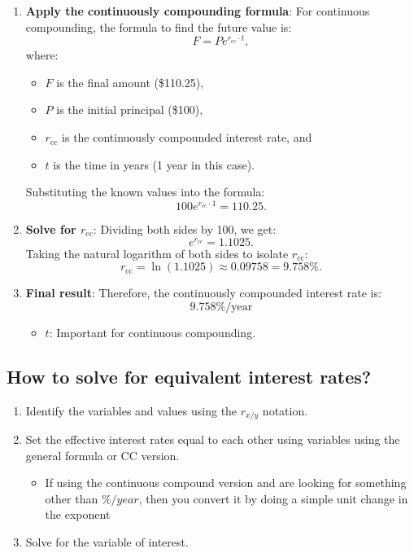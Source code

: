 \begin{example}
    \begin{enumerate}
        \item \textbf{Apply the continuously compounding formula}: 
        For continuous compounding, the formula to find the future value is:
        \[
        F = P e^{r_{\text{cc}} \cdot t},
        \]
        where:
        \begin{itemize}
            \item \(F\) is the final amount (\$110.25),
            \item \(P\) is the initial principal (\$100),
            \item \(r_{\text{cc}}\) is the continuously compounded interest rate, and
            \item \(t\) is the time in years (1 year in this case).
        \end{itemize}
        Substituting the known values into the formula:
        \[
        100 e^{r_{\text{cc}} \cdot 1} = 110.25.
        \]

        \item \textbf{Solve for \(r_{\text{cc}}\)}: 
        Dividing both sides by 100, we get:
        \[
        e^{r_{\text{cc}}} = 1.1025.
        \]
        Taking the natural logarithm of both sides to isolate \(r_{\text{cc}}\):
        \[
        r_{\text{cc}} = \ln(1.1025) \approx 0.09758 = 9.758\%.
        \]

        \item \textbf{Final result}: 
        Therefore, the continuously compounded interest rate is:
        \[
        \boxed{9.758\%/\text{year}}
        \]
        \begin{itemize}
            \item $t$: Important for continuous compounding.
        \end{itemize}
    \end{enumerate}
\end{example}

\subsection{How to solve for equivalent interest rates?}
\begin{process}
    \begin{enumerate}
        \item Identify the variables and values using the $r_{x/y}$ notation. 
        \item Set the effective interest rates equal to each other using variables using the general formula or CC version.
        \begin{itemize}
            \item If using the continuous compound version and are looking for something other than $\%/year$, then you convert it by doing a simple unit change in the exponent
        \end{itemize}
        \item Solve for the variable of interest. 
    \end{enumerate}
\end{process}

